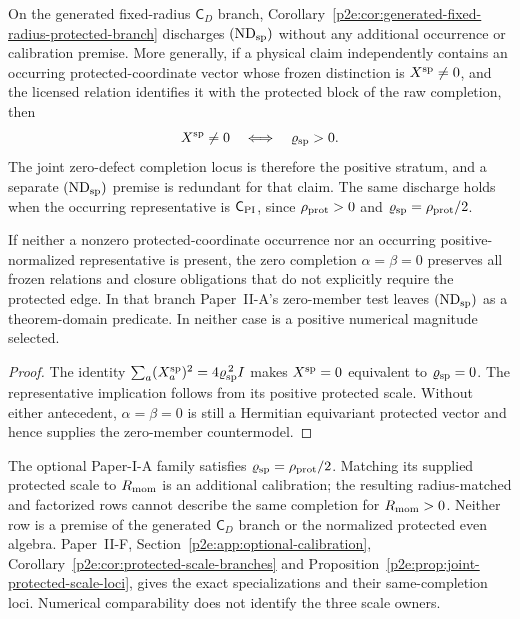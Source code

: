 \documentclass[12pt,a4paper]{article}
\begin{document}
\begin{corollary}
\label{p2e:cor:joint-protected-nondegeneracy-discharge}
On the generated fixed-radius \(\mathsf C_D\) branch,
Corollary~\ref{p2e:cor:generated-fixed-radius-protected-branch} discharges
\((\mathrm{ND}_{\rm sp})\) without any additional occurrence or calibration
premise.  More generally, if a physical claim independently contains an
occurring protected-coordinate
vector whose frozen distinction is \(X^{\rm sp}\neq0\), and the licensed
relation identifies it with the protected block of the raw completion, then
\[
 X^{\rm sp}\neq0
 \quad\Longleftrightarrow\quad
 \varrho_{\rm sp}>0.
\]
The joint zero-defect completion locus is therefore the positive stratum, and
a separate \((\mathrm{ND}_{\rm sp})\) premise is redundant for that claim.
The same discharge holds when the occurring representative is
\(\mathsf C_{\rm PI}\), since
\(\rho_{\rm prot}>0\) and
\(\varrho_{\rm sp}=\rho_{\rm prot}/2\).

If neither a nonzero protected-coordinate occurrence nor an occurring
positive-normalized representative is present, the zero completion
\(\alpha=\beta=0\) preserves all frozen relations and closure obligations that
do not explicitly require the protected edge.  In that branch Paper~II-A's
zero-member test leaves \((\mathrm{ND}_{\rm sp})\) as a theorem-domain
predicate.  In neither case is a positive numerical magnitude selected.
\end{corollary}

\begin{proof}
The identity
\(\sum_a(X_a^{\rm sp})^2=4\varrho_{\rm sp}^{\,2}I\) makes
\(X^{\rm sp}=0\) equivalent to \(\varrho_{\rm sp}=0\).
The representative implication follows from its positive protected scale.
Without either antecedent, \(\alpha=\beta=0\) is still a Hermitian equivariant
protected vector and hence supplies the zero-member countermodel.
\end{proof}

\begin{remark}
The optional Paper-I-A family satisfies
\(\varrho_{\rm sp}=\rho_{\rm prot}/2\).  Matching its supplied protected
scale to \(R_{\mathrm{mom}}\) is an additional calibration; the resulting
radius-matched and factorized rows cannot describe the same completion for
\(R_{\mathrm{mom}}>0\).  Neither row is a premise of the generated
\(\mathsf C_D\) branch or the normalized protected even algebra.
Paper~II-F, Section~\ref{p2e:app:optional-calibration},
Corollary~\ref{p2e:cor:protected-scale-branches} and
Proposition~\ref{p2e:prop:joint-protected-scale-loci}, gives the exact
specializations and their same-completion loci.  Numerical comparability
does not identify the three scale owners.
\end{remark}
\end{document}
